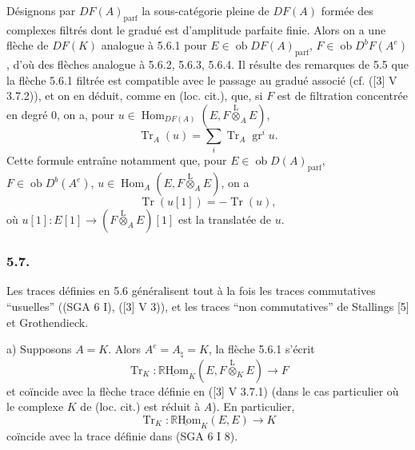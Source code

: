 \documentclass[11pt]{article}
\DeclareMathOperator{\Hom}{Hom}
\newcommand{\R}{\mathbb{R}}\newcommand{\RHomCore}{\mathbb{R}\mathrm{Hom}}
\newcommand{\ob}{\operatorname{ob}}
\providecommand{\RHom}{\RHomCore}
\providecommand{\uRHom}{\underline{\RHom}}
\providecommand{\Tr}{\operatorname{Tr}}
\providecommand{\Tr}{\operatorname{Tr}}
\providecommand{\lten}{\overset{\mathrm L}{\otimes}}
\providecommand{\Tr}{\operatorname{Tr}}
\providecommand{\RHom}{\RHomCore}
\providecommand{\Hom}{\operatorname{Hom}}
\providecommand{\ob}{\operatorname{ob}}
\providecommand{\lten}{\overset{\mathrm L}{\otimes}}
\providecommand{\RHom}{\R\mathcal{H}om}
\providecommand{\lten}{\overset{\mathrm L}{\otimes}}
\providecommand{\R}{\mathrm R}
\providecommand{\Tr}{\operatorname{Tr}}
\providecommand{\lten}{\overset{\mathrm L}{\otimes}}
\providecommand{\lten}{\overset{\mathrm L}{\otimes}}
\providecommand{\lten}{\overset{\mathrm L}{\otimes}}
\providecommand{\RHom}{\RHomCore}
\providecommand{\Hom}{\operatorname{Hom}}
\providecommand{\Tr}{\operatorname{Tr}}
\providecommand{\lten}{\overset{\mathrm L}{\otimes}}
\begin{document}
Désignons par $DF(A)_{\mathrm{parf}}$ la sous-catégorie pleine de $DF(A)$ formée des complexes filtrés dont le gradué est d'amplitude parfaite finie. Alors on a une flèche de $DF(K)$ analogue à 5.6.1 pour $E\in\ob DF(A)_{\mathrm{parf}}$, $F\in\ob D^bF(A^e)$, d'où des flèches analogue à 5.6.2, 5.6.3, 5.6.4. Il résulte des remarques de 5.5 que la flèche 5.6.1 filtrée est compatible avec le passage au gradué associé (cf. ([3] V 3.7.2)), et on en déduit, comme en (loc. cit.), que, si $F$ est de filtration concentrée en degré $0$, on a, pour $u\in\Hom_{DF(A)}(E,F\lten_AE)$,
\begin{equation}\tag{5.6.5}
\Tr_A(u)=\sum_i\Tr_A\operatorname{gr}^i u.
\end{equation}
Cette formule entraîne notamment que, pour $E\in\ob D(A)_{\mathrm{parf}}$, $F\in\ob D^b(A^e)$, $u\in\Hom_A(E,F\lten_AE)$, on a
\begin{equation}\tag{5.6.6}
\Tr(u[1])=-\Tr(u),
\end{equation}
où $u[1]:E[1]\to(F\lten_AE)[1]$ est la translatée de $u$.

\subsubsection*{5.7.}

Les traces définies en 5.6 généralisent tout à la fois les traces commutatives ``usuelles'' ((SGA 6 I), ([3] V 3)), et les traces ``non commutatives'' de Stallings [5] et Grothendieck.

a) Supposons $A=K$. Alors $A^e=A_\natural=K$, la flèche 5.6.1 s'écrit
\[
\Tr_K:\uRHom_K(E,F\lten_KE)\longrightarrow F
\]
et
coïncide avec la flèche trace définie en ([3] V 3.7.1) (dans le cas particulier où le complexe $K$ de (loc. cit.) est réduit à $A$). En particulier,
\[
\Tr_K:\uRHom_K(E,E)\longrightarrow K
\]
coïncide avec la trace définie dans (SGA 6 I 8).
\end{document}
